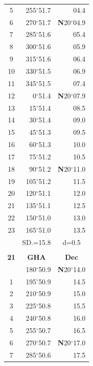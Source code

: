 \documentclass[10pt, a4paper]{report}
\begin{document}
\begin{scriptsize}
\begin{tabular*}{0.2\textwidth}[t]{@{\extracolsep{\fill}}|c|rr|}
5 & 255$^\circ$51.7 & 04.4\\[2Pt]
6 & 270$^\circ$51.7 & \textbf{N}20$^\circ$04.9\\
7 & 285$^\circ$51.6 & 05.4\\
8 & 300$^\circ$51.6 & 05.9\\
9 & 315$^\circ$51.6 & \raisebox{0.24ex}{\boldmath$\cdot$~\boldmath$\cdot$~~}06.4\\
10 & 330$^\circ$51.5 & 06.9\\
11 & 345$^\circ$51.5 & 07.4\\[2Pt]
12 & 0$^\circ$51.4 & \textbf{N}20$^\circ$07.9\\
13 & 15$^\circ$51.4 & 08.5\\
14 & 30$^\circ$51.4 & 09.0\\
15 & 45$^\circ$51.3 & \raisebox{0.24ex}{\boldmath$\cdot$~\boldmath$\cdot$~~}09.5\\
16 & 60$^\circ$51.3 & 10.0\\
17 & 75$^\circ$51.2 & 10.5\\[2Pt]
18 & 90$^\circ$51.2 & \textbf{N}20$^\circ$11.0\\
19 & 105$^\circ$51.2 & 11.5\\
20 & 120$^\circ$51.1 & 12.0\\
21 & 135$^\circ$51.1 & \raisebox{0.24ex}{\boldmath$\cdot$~\boldmath$\cdot$~~}12.5\\
22 & 150$^\circ$51.0 & 13.0\\
23 & 165$^\circ$51.0 & 13.5\\
\hline
\rule{0pt}{2.4ex} & \multicolumn{1}{c}{SD.=15.8} & \multicolumn{1}{c|}{d=0.5}\\
\hline
\multicolumn{1}{c}{}\\[-0.5ex]\hline
\multicolumn{1}{|c|}{\rule{0pt}{2.6ex}\textbf{21}} & \multicolumn{1}{c}{\textbf{GHA}} & \multicolumn{1}{c|}{\textbf{Dec}}\\
\hline\rule{0pt}{2.6ex}\noindent
0 & 180$^\circ$50.9 & \textbf{N}20$^\circ$14.0\\
1 & 195$^\circ$50.9 & 14.5\\
2 & 210$^\circ$50.9 & 15.0\\
3 & 225$^\circ$50.8 & \raisebox{0.24ex}{\boldmath$\cdot$~\boldmath$\cdot$~~}15.5\\
4 & 240$^\circ$50.8 & 16.0\\
5 & 255$^\circ$50.7 & 16.5\\[2Pt]
6 & 270$^\circ$50.7 & \textbf{N}20$^\circ$17.0\\
7 & 285$^\circ$50.6 & 17.5\\

\end{tabular*}
\end{scriptsize}
\end{document}
